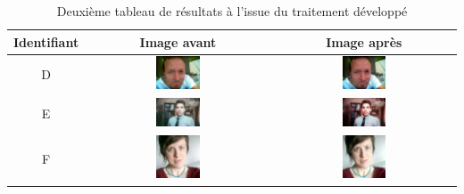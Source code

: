 \documentclass[11pt, french]{report-rd-info}
\begin{document}
\begin{table}
\centering
\begin{tabular}{|c|c|c|}	
   \hline \textbf{Identifiant}  &  \textbf{Image avant}  &  \textbf{Image après}  \\ \hline 
   D & \includegraphics[width=0.25\textwidth]{Resultats/pd_avant} & \includegraphics[width=0.25\textwidth]{Resultats/pd_apres} \\ \hline   
   E & \includegraphics[width=0.25\textwidth]{Resultats/pe_avant} & \includegraphics[width=0.25\textwidth]{Resultats/pe_apres} \\ \hline   
   F & \includegraphics[width=0.25\textwidth]{Resultats/pf_avant} & \includegraphics[width=0.25\textwidth]{Resultats/pf_apres} \\ \hline
\end{tabular}
\caption{Deuxième tableau de résultats à l'issue du traitement développé}
\label{tab:Resultats2}
\end{table}
\end{document}
